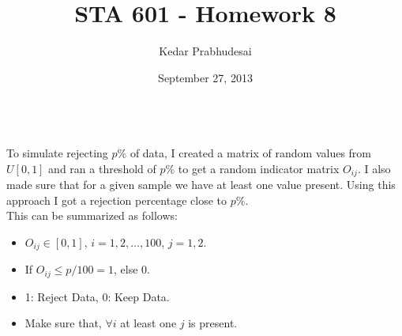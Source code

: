 \documentclass{article}
\title{STA 601 - Homework 8}
\author{Kedar Prabhudesai}
\date{September 27, 2013}
\begin{document}
\maketitle

\\

\noindent To simulate rejecting $p\%$ of data, I created a matrix of random values from $U[0,1]$ and ran a threshold of $p\%$ to get a random indicator matrix $O_{ij}$. I also made sure that for a given sample we have at least one value present. Using this approach I got a rejection percentage close to $p\%$.\\

\noindent This can be summarized as follows:
\begin{itemize}
\item $O_{ij} \in [0,1]$, $i = 1,2,\ldots,100$, $j = 1,2.$
\item If $O_{ij} \leq p/100 = 1$, else 0.
\item 1: Reject Data, 0: Keep Data.
\item Make sure that, $\forall i$ at least one $j$ is present.\\
\end{itemize}
\end{document}

